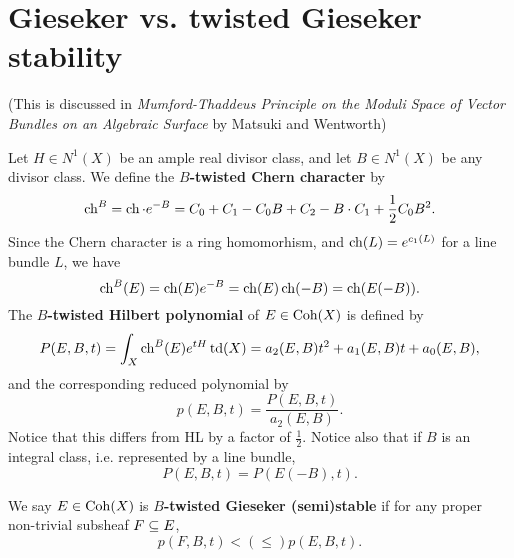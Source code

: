\documentclass[letterpaper,10pt]{article}
\begin{document}
\section{Gieseker vs. twisted Gieseker stability}

(This is discussed in \emph{Mumford-Thaddeus Principle on the Moduli Space
of Vector Bundles on an Algebraic Surface} by Matsuki and Wentworth)

Let $H \in N^1(X)$ be an ample real divisor class, and let $B \in N^1(X)$ be any divisor class. We define the {\bf $B$-twisted Chern character} by
\[ \operatorname{\mathrm{ch}}^B = \operatorname{\mathrm{ch}} \cdot e^{-B} = C_0 + C_1 - C_0 B + C_2 - B \cdot C_1 + \frac{1}{2} C_0 B^2. \]
Since the Chern character is a ring homomorhism, and $\operatorname{\mathrm{ch}}(L) = e^{c_1(L)}$ for a line bundle $L$, we have
\[ \operatorname{\mathrm{ch}}^B(E) = \operatorname{\mathrm{ch}}(E) e^{-B} = \operatorname{\mathrm{ch}}(E) \operatorname{\mathrm{ch}}(-B) = \operatorname{\mathrm{ch}}(E(-B)). \]
The {\bf $B$-twisted Hilbert polynomial} of $E \in \mathrm{Coh}(X)$ is defined by
\[ P(E, B, t) = \int_X \operatorname{\mathrm{ch}}^B(E) e^{t H} \operatorname{\mathrm{td}}(X) = a_2(E, B) t^2 + a_1(E, B) t + a_0(E, B), \]
and the corresponding reduced polynomial by
\[ p(E, B, t) = \frac{P(E, B, t)}{a_2(E, B)}. \]
Notice that this differs from HL by a factor of $\frac{1}{2}$. Notice also that if $B$ is an integral class, i.e. represented by a line bundle, 
\[ P(E, B, t) = P(E(-B), t). \]

We say $E \in \mathrm{Coh}(X)$ is {\bf $B$-twisted Gieseker (semi)stable} if for any proper non-trivial subsheaf $F \subseteq E$,
\[ p(F, B, t) < (\leq) p(E, B, t). \]
\end{document}

